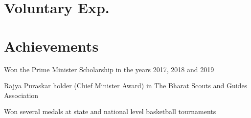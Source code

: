 \documentclass[]{deedy-resume-openfont}
\begin{document}
\begin{minipage}[t]{0.66\textwidth}
%
%

\section{Voluntary Exp.}

\sectionsep

\section{Achievements}
\vspace{\topsep}
\begin{tightemize}
\item Won the Prime Minister Scholarship in the years 2017, 2018 and 2019
\item Rajya Puraskar holder (Chief Minister Award) in The Bharat Scouts and Guides
Association
\item Won several medals at state and national level basketball tournaments
\end{tightemize}


\end{minipage} 
\end{document}
